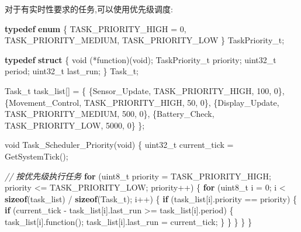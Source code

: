 \documentclass[
]{article}
\newenvironment{Shaded}{}{}
\newcommand{\CommentTok}[1]{\textcolor[rgb]{0.38,0.63,0.69}{\textit{#1}}}
\newcommand{\ControlFlowTok}[1]{\textcolor[rgb]{0.00,0.44,0.13}{\textbf{#1}}}
\newcommand{\DataTypeTok}[1]{\textcolor[rgb]{0.56,0.13,0.00}{#1}}
\newcommand{\DecValTok}[1]{\textcolor[rgb]{0.25,0.63,0.44}{#1}}
\newcommand{\KeywordTok}[1]{\textcolor[rgb]{0.00,0.44,0.13}{\textbf{#1}}}
\newcommand{\NormalTok}[1]{#1}
\begin{document}
对于有实时性要求的任务,可以使用优先级调度:

\begin{Shaded}
\begin{Highlighting}[]
\KeywordTok{typedef} \KeywordTok{enum}\NormalTok{ \{}
\NormalTok{    TASK\_PRIORITY\_HIGH = }\DecValTok{0}\NormalTok{,}
\NormalTok{    TASK\_PRIORITY\_MEDIUM,}
\NormalTok{    TASK\_PRIORITY\_LOW}
\NormalTok{\} TaskPriority\_t;}

\KeywordTok{typedef} \KeywordTok{struct}\NormalTok{ \{}
    \DataTypeTok{void}\NormalTok{ (*function)(}\DataTypeTok{void}\NormalTok{);}
\NormalTok{    TaskPriority\_t priority;}
    \DataTypeTok{uint32\_t}\NormalTok{ period;}
    \DataTypeTok{uint32\_t}\NormalTok{ last\_run;}
\NormalTok{\} Task\_t;}

\NormalTok{Task\_t task\_list[] = \{}
\NormalTok{    \{Sensor\_Update, TASK\_PRIORITY\_HIGH, }\DecValTok{100}\NormalTok{, }\DecValTok{0}\NormalTok{\},}
\NormalTok{    \{Movement\_Control, TASK\_PRIORITY\_HIGH, }\DecValTok{50}\NormalTok{, }\DecValTok{0}\NormalTok{\},}
\NormalTok{    \{Display\_Update, TASK\_PRIORITY\_MEDIUM, }\DecValTok{500}\NormalTok{, }\DecValTok{0}\NormalTok{\},}
\NormalTok{    \{Battery\_Check, TASK\_PRIORITY\_LOW, }\DecValTok{5000}\NormalTok{, }\DecValTok{0}\NormalTok{\}}
\NormalTok{\};}

\DataTypeTok{void}\NormalTok{ Task\_Scheduler\_Priority(}\DataTypeTok{void}\NormalTok{)}
\NormalTok{\{}
    \DataTypeTok{uint32\_t}\NormalTok{ current\_tick = GetSystemTick();}
    
    \CommentTok{// 按优先级执行任务}
    \ControlFlowTok{for}\NormalTok{ (}\DataTypeTok{uint8\_t}\NormalTok{ priority = TASK\_PRIORITY\_HIGH; priority \textless{}= TASK\_PRIORITY\_LOW; priority++) \{}
        \ControlFlowTok{for}\NormalTok{ (}\DataTypeTok{uint8\_t}\NormalTok{ i = }\DecValTok{0}\NormalTok{; i \textless{} }\KeywordTok{sizeof}\NormalTok{(task\_list) / }\KeywordTok{sizeof}\NormalTok{(Task\_t); i++) \{}
            \ControlFlowTok{if}\NormalTok{ (task\_list[i].priority == priority) \{}
                \ControlFlowTok{if}\NormalTok{ (current\_tick {-} task\_list[i].last\_run \textgreater{}= task\_list[i].period) \{}
\NormalTok{                    task\_list[i].function();}
\NormalTok{                    task\_list[i].last\_run = current\_tick;}
\NormalTok{                \}}
\NormalTok{            \}}
\NormalTok{        \}}
\NormalTok{    \}}
\NormalTok{\}}
\end{Highlighting}
\end{Shaded}
\end{document}
